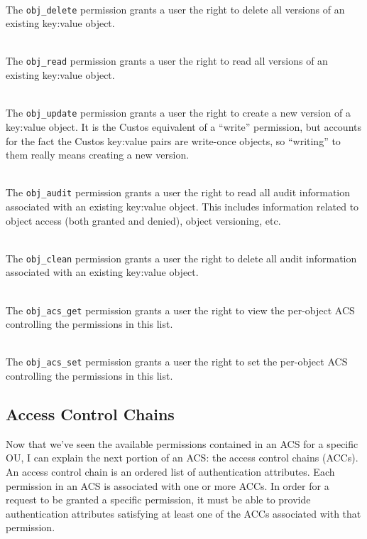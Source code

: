 \begin{packed_desc}
\item[\texttt{obj\_delete}] \hfill \\ The \texttt{obj\_delete}
  permission grants a user the right to delete all versions of an
  existing key:value object.
\item[\texttt{obj\_read}] \hfill \\ The \texttt{obj\_read} permission
  grants a user the right to read all versions of an existing
  key:value object.
\item[\texttt{obj\_update}] \hfill \\ The \texttt{obj\_update}
  permission grants a user the right to create a new version of a
  key:value object. It is the Custos equivalent of a ``write''
  permission, but accounts for the fact the Custos key:value pairs are
  write-once objects, so ``writing'' to them really means creating a
  new version.
\item[\texttt{obj\_audit}] \hfill \\ The \texttt{obj\_audit}
  permission grants a user the right to read all audit information
  associated with an existing key:value object. This includes
  information related to object access (both granted and denied),
  object versioning, etc.
\item[\texttt{obj\_clean}] \hfill \\ The \texttt{obj\_clean}
  permission grants a user the right to delete all audit information
  associated with an existing key:value object.
\item[\texttt{obj\_acs\_get}] \hfill \\ The \texttt{obj\_acs\_get}
  permission grants a user the right to view the per-object ACS
  controlling the permissions in this list.
\item[\texttt{obj\_acs\_set}] \hfill \\ The \texttt{obj\_acs\_set}
  permission grants a user the right to set the per-object ACS
  controlling the permissions in this list.
\end{packed_desc}

\subsection{Access Control Chains}

Now that we've seen the available permissions contained in an ACS for
a specific OU, I can explain the next portion of an ACS: the access
control chains (ACCs). An access control chain is an ordered list of
authentication attributes. Each permission in an ACS is associated
with one or more ACCs. In order for a request to be granted a specific
permission, it must be able to provide authentication attributes
satisfying at least one of the ACCs associated with that permission.

